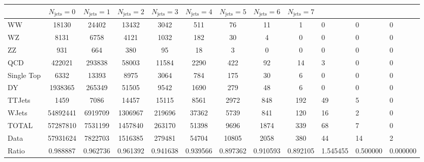 \footnotesize{
\begin{tabular}{l|cccccccc} 
  &  $N_{\text{jets}} = 0 $ & $N_{\text{jets}} = 1 $ & $N_{\text{jets}} = 2 $ & $N_{\text{jets}} = 3 $ & $N_{\text{jets}} = 4 $ & $N_{\text{jets}} = 5 $ & $N_{\text{jets}} = 6 $ & $N_{\text{jets}} = 7$ \\ \hline 
   WW        & 18130 & 24402 & 13432 & 3042 & 511 & 76 & 11 & 1 & 0 & 0 & 0 \\ 
   WZ        & 8131 & 6758 & 4121 & 1032 & 182 & 30 & 4 & 0 & 0 & 0 & 0 \\ 
   ZZ        & 931 & 664 & 380 & 95 & 18 & 3 & 0 & 0 & 0 & 0 & 0 \\ 
   QCD        & 422021 & 293838 & 58003 & 11584 & 2290 & 422 & 92 & 14 & 3 & 0 & 0 \\ 
   Single Top        & 6332 & 13393 & 8975 & 3064 & 784 & 175 & 30 & 6 & 0 & 0 & 0 \\ 
   DY        & 1938365 & 265349 & 51505 & 9542 & 1690 & 279 & 48 & 6 & 0 & 0 & 0 \\ 
   TTJets        & 1459 & 7086 & 14457 & 15115 & 8561 & 2972 & 848 & 192 & 49 & 5 & 0 \\ 
   WJets        & 54892441 & 6919709 & 1306967 & 219696 & 37362 & 5739 & 841 & 120 & 16 & 2 & 0 \\ 
 \hline 
 TOTAL & 57287810 & 7531199 & 1457840 & 263170 & 51398 & 9696 & 1874 & 339 & 68 & 7 & 0 \\ 
 \hline 
 Data          & 57931624 & 7822703 & 1516385 & 279481 & 54704 & 10805 & 2058 & 380 & 44 & 14 & 2 \\ 
  Ratio          & 0.988887 & 0.962736 & 0.961392 & 0.941638 & 0.939566 & 0.897362 & 0.910593 & 0.892105 & 1.545455 & 0.500000 & 0.000000 \\ 
 \end{tabular}}
